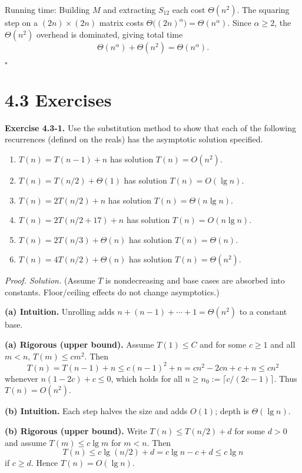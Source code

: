 \documentclass[12pt]{article}
\theoremstyle{definition}
\begin{document}
Running time: Building $M$ and extracting $S_{12}$ each cost $\Theta(n^2)$.
The squaring step on a $(2n)\times(2n)$ matrix costs $\Theta\!\big((2n)^{\alpha}\big)=\Theta(n^{\alpha})$.
Since $\alpha\ge 2$, the $\Theta(n^2)$ overhead is dominated, giving total time
\[
\Theta(n^{\alpha})+\Theta(n^2)=\Theta(n^{\alpha}).
\]

\hfill$\square$

\newpage

\dotfill
\section*{4.3 Exercises}
\dotfill

\newpage

\noindent\textbf{Exercise 4.3-1.}
Use the substitution method to show that each of the following recurrences (defined on the reals)
has the asymptotic solution specified.

\begin{enumerate}
\item $T(n)=T(n-1)+n$ has solution $T(n)=O(n^2)$.
\item $T(n)=T(n/2)+\Theta(1)$ has solution $T(n)=O(\lg n)$.
\item $T(n)=2T(n/2)+n$ has solution $T(n)=\Theta(n\lg n)$.
\item $T(n)=2T(n/2+17)+n$ has solution $T(n)=O(n\lg n)$.
\item $T(n)=2T(n/3)+\Theta(n)$ has solution $T(n)=\Theta(n)$.
\item $T(n)=4T(n/2)+\Theta(n)$ has solution $T(n)=\Theta(n^2)$.
\end{enumerate}

\medskip
\noindent\textit{Proof. Solution.} (Assume $T$ is nondecreasing and base cases are absorbed into constants. Floor/ceiling effects do not change asymptotics.)

\textbf{(a) Intuition.}
Unrolling adds $n+(n-1)+\cdots+1=\Theta(n^2)$ to a constant base.

\textbf{(a) Rigorous (upper bound).}
Assume $T(1)\le C$ and for some $c\ge1$ and all $m<n$, $T(m)\le c m^2$.
Then
\[
T(n)=T(n-1)+n\le c(n-1)^2+n
= c n^2-2cn+c+n\le c n^2
\]
whenever $n(1-2c)+c\le 0$, which holds for all $n\ge n_0:=\lceil c/(2c-1)\rceil$.
Thus $T(n)=O(n^2)$.

\textbf{(b) Intuition.}
Each step halves the size and adds $O(1)$; depth is $\Theta(\lg n)$.

\textbf{(b) Rigorous (upper bound).}
Write $T(n)\le T(n/2)+d$ for some $d>0$ and assume $T(m)\le c\lg m$ for $m<n$.
Then
\[
T(n)\le c\lg(n/2)+d=c\lg n - c + d \le c\lg n
\]
if $c\ge d$. Hence $T(n)=O(\lg n)$.
\end{document}
